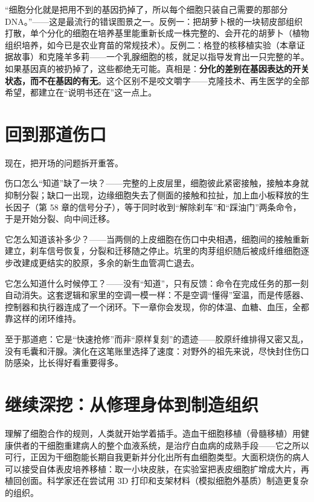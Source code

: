 \begin{wuqu}
“细胞分化就是把用不到的基因扔掉了，所以每个细胞只装自己需要的那部分 DNA。”——这是最流行的错误图景之一。反例一：把胡萝卜根的一块韧皮部组织打散，单个分化的细胞在培养基里能重新长成一株完整的、会开花的胡萝卜（植物组织培养，如今已是农业育苗的常规技术）。反例二：格登的核移植实验（本章证据故事）和克隆羊多莉——一个乳腺细胞的核，就足以指导发育出一只完整的羊。如果基因真的被扔掉了，这些都绝无可能。真相是：\textbf{分化的差别在基因表达的开关状态，而不在基因的有无}。这个区别不是咬文嚼字——克隆技术、再生医学的全部希望，都建立在“说明书还在”这一点上。
\end{wuqu}

\section{回到那道伤口}

现在，把开场的问题拆开重答。

伤口怎么“知道”缺了一块？——完整的上皮层里，细胞彼此紧密接触，接触本身就抑制分裂；缺口一出现，边缘细胞失去了侧面的接触和拉扯，加上血小板释放的生长因子（第 58 章的信号分子），等于同时收到“解除刹车”和“踩油门”两条命令，于是开始分裂、向中间迁移。

它怎么知道该补多少？——当两侧的上皮细胞在伤口中央相遇，细胞间的接触重新建立，刹车信号恢复，分裂和迁移随之停止。坑里的肉芽组织随后被成纤维细胞逐步改建成更结实的胶原，多余的新生血管凋亡退去。

它怎么知道什么时候停工？——没有“知道”，只有反馈：命令在完成任务的那一刻自动消失。这套逻辑和家里的空调一模一样：不是空调“懂得”室温，而是传感器、控制器和执行器连成了一个闭环。下一章你会发现，你的体温、血糖、血压，全都靠这样的闭环维持。

至于那道疤：它是“快速抢修”而非“原样复刻”的遗迹——胶原纤维排得又密又乱，没有毛囊和汗腺。演化在这笔账里选择了速度：对野外的祖先来说，尽快封住伤口防感染，比长得好看重要得多。

\section{继续深挖：从修理身体到制造组织}

理解了细胞合作的规则，人类就开始学着插手。造血干细胞移植（骨髓移植）用健康供者的干细胞重建病人的整个血液系统，是治疗白血病的成熟手段——它之所以可行，正因为干细胞能长期自我更新并分化出所有血细胞类型。大面积烧伤的病人可以接受自体表皮培养移植：取一小块皮肤，在实验室把表皮细胞扩增成大片，再植回创面。科学家还在尝试用 3D 打印和支架材料（模拟细胞外基质）制造更复杂的组织。

